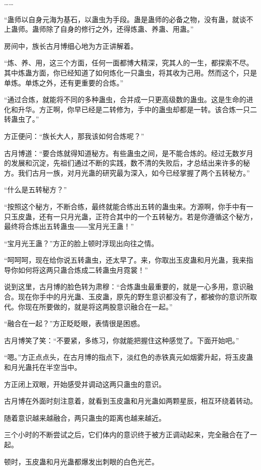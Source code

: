 \begin{this_body}
……

“蛊师以自身元海为基石，以蛊虫为手段。蛊是蛊师的必备之物，没有蛊，就谈不上蛊师。蛊师除了自身的修行之外，还得炼蛊、养蛊、用蛊。”

房间中，族长古月博细心地为方正讲解着。

“炼、养、用，这三个方面，任何一面都博大精深，究其人的一生，都探索不尽。其中炼蛊方面，你已经知道了如何炼化一只蛊虫，将其收为己用。然而这个，只是单炼。单炼之外，还有更重要的合炼。”

“通过合炼，就能将不同的多种蛊虫，合并成一只更高级数的蛊虫。这是生命的进化和升华。方正啊，你早已经是二转修为，手中的蛊虫却都是一转。该合炼一只二转蛊虫了。”

方正便问：“族长大人，那我该如何合炼呢？”

古月博道：“要合炼就得知道秘方。有些蛊虫之间，是不能合炼的。经过无数岁月的发展和沉淀，先祖们通过不断的实践，数不清的失败后，才总结出来许多的秘方。我们古月一族，对月光蛊的研究最为深入，如今已经掌握了两个五转秘方。”

“什么是五转秘方？”

“按照这个秘方，不断合练，最终就能合练出五转的蛊虫来。方源啊，你手中有一只玉皮蛊，还有一只月光蛊，正符合其中的一个五转秘方。若是你遵循这个秘方，最终将合炼出五转蛊虫――宝月光王蛊！”

“宝月光王蛊？”方正的脸上顿时浮现出向往之情。

“呵呵呵，现在给你说五转蛊虫，还太早了。来，你取出玉皮蛊和月光蛊，我来指导你如何将这两只蛊合炼成二转蛊虫月霓裳！”

说到这里，古月博的脸色转为肃穆：“合炼蛊虫最重要的，就是一心多用，意识融合。现在你手中的月光蛊、玉皮蛊，原先的野生意识都没有了，都被你的意识所取代。你现在所要做的，就是将这两股意识融合在一起。”

“融合在一起？”方正眨眨眼，表情很是困惑。

古月博笑了笑：“不要紧，多练习，你就能把握住这种感觉了。下面开始吧。”

“嗯。”方正点点头，在古月博的指点下，淡红色的赤铁真元如烟雾升起，将玉皮蛊和月光蛊托在半空当中。

方正闭上双眼，开始感受并调动这两只蛊虫的意识。

古月博在外面时刻注意着，就看到玉皮蛊和月光蛊如两颗星辰，相互环绕着转动。

随着意识越来越融合，两只蛊虫的距离也越来越近。

三个小时的不断尝试之后，它们体内的意识终于被方正调动起来，完全融合在了一起。

顿时，玉皮蛊和月光蛊都爆发出刺眼的白色光芒。


\end{this_body}
